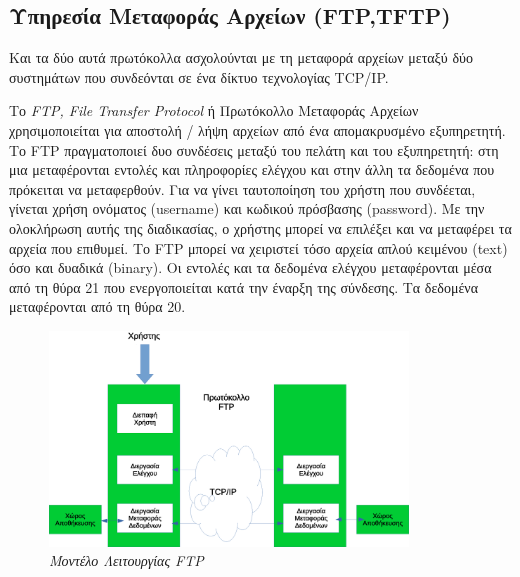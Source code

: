 %
%
\subsection{Υπηρεσία Μεταφοράς Αρχείων (FTP,TFTP)}

Και τα δύο αυτά πρωτόκολλα ασχολούνται με τη μεταφορά αρχείων μεταξύ δύο συστημάτων που συνδεόνται σε ένα δίκτυο τεχνολογίας TCP/IP.

Το \emph{FTP, File Transfer Protocol} ή Πρωτόκολλο Μεταφοράς Αρχείων χρησιμοποιείται για αποστολή / λήψη αρχείων από ένα απομακρυσμένο εξυπηρετητή. Το FTP πραγματοποιεί δυο συνδέσεις μεταξύ του πελάτη και του εξυπηρετητή: στη μια μεταφέρονται εντολές και πληροφορίες ελέγχου και στην άλλη τα δεδομένα που πρόκειται να μεταφερθούν. Για να γίνει ταυτοποίηση του χρήστη που συνδέεται, γίνεται χρήση ονόματος (username) και κωδικού πρόσβασης (password). Με την ολοκλήρωση αυτής της διαδικασίας, ο χρήστης μπορεί να επιλέξει και να μεταφέρει τα αρχεία που επιθυμεί. Το FTP μπορεί να χειριστεί τόσο αρχεία απλού κειμένου (text) όσο και δυαδικά (binary). Οι εντολές και τα δεδομένα ελέγχου μεταφέρονται μέσα από τη θύρα 21 που ενεργοποιείται κατά την έναρξη της σύνδεσης. Τα δεδομένα μεταφέρονται από τη θύρα 20.

\begin{figure}[!ht]
 \centering
 \includegraphics[width=0.85\textwidth]{images/chapter6/6-8}
 \caption {\textsl{Μοντέλο Λειτουργίας FTP}}
 \label{6-8}
\end{figure}

